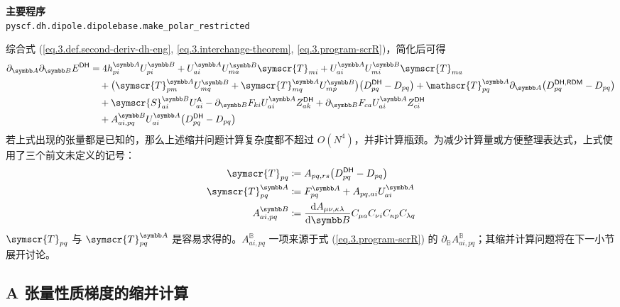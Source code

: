\begin{tcolorbox}
    \textbf{主要程序}\\
    \verb|pyscf.dh.dipole.dipolebase.make_polar_restricted|
\end{tcolorbox}

综合式 (\ref{eq.3.def.second-deriv-dh-eng}, \ref{eq.3.interchange-theorem}, \ref{eq.3.program-scrR})，简化后可得
\begin{align}
    \label{eq.3.program-dh-sec-deriv}
    \partial_\mathbb{A} \partial_\mathbb{B} E^\textmt{DH}
    &=
    4 h_{pi}^\mathbb{A} U_{pi}^\mathbb{B}
    + U_{ai}^\mathbb{A} U_{ma}^\mathbb{B} \symscr{T}_{mi}
    + U_{ai}^\mathbb{A} U_{mi}^\mathbb{B} \symscr{T}_{ma}
    \notag\\ &\quad
    + \big( \symscr{T}_{pm}^\mathbb{A} U_{mq}^\mathbb{B} + \symscr{T}_{mq}^\mathbb{A} U_{mp}^\mathbb{B} \big) \big( D_{pq}^\textmt{DH} - D_{pq} \big)
    + \mathscr{T}_{pq}^\mathbb{A} \partial_\mathbb{A} \big( D_{pq}^{\textmt{DH}, \textmt{RDM}} - D_{pq} \big)
    \notag\\ &\quad
    + \symscr{S}_{ai}^\mathbb{B} U_{ai}^\textmt{A} - \partial_\mathbb{B} F_{ki} U_{ai}^\mathbb{A} Z_{ak}^\textmt{DH} + \partial_\mathbb{B} F_{ca} U_{ai}^\mathbb{A} Z_{ci}^\textmt{DH}
    \notag\\ &\quad
    + A_{ai, pq}^\mathbb{B} U_{ai}^\mathbb{A} \big( D_{pq}^\textmt{DH} - D_{pq} \big)
\end{align}
若上式出现的张量都是已知的，那么上述缩并问题计算复杂度都不超过 $O(N^4)$，并非计算瓶颈。为减少计算量或方便整理表达式，上式使用了三个前文未定义的记号：
\begin{align}
    \symscr{T}_{pq} &\coloneq A_{pq, rs} \big( D_{pq}^\textmt{DH} - D_{pq} \big) \\
    \symscr{T}_{pq}^\mathbb{A} &\coloneq F_{pq}^\mathbb{A} + A_{pq, ai} U_{ai}^\mathbb{A} \\
    \label{eq.3.def.a-tensor-deriv}
    A_{ai, pq}^\mathbb{B} &\coloneq \frac{\mathrm{d} A_{\mu \nu, \kappa \lambda}}{\mathrm{d} \mathbb{B}} C_{\mu a} C_{\nu i} C_{\kappa p} C_{\lambda q}
\end{align}
$\symscr{T}_{pq}$ 与 $\symscr{T}_{pq}^\mathbb{A}$ 是容易求得的。$A_{ai, pq}^\mathbb{B}$ 一项来源于式 (\ref{eq.3.program-scrR}) 的 $\partial_\mathbb{B} A_{ai, pq}^\mathbb{B}$；其缩并计算问题将在下一小节展开讨论。

\subsection{A 张量性质梯度的缩并计算}

